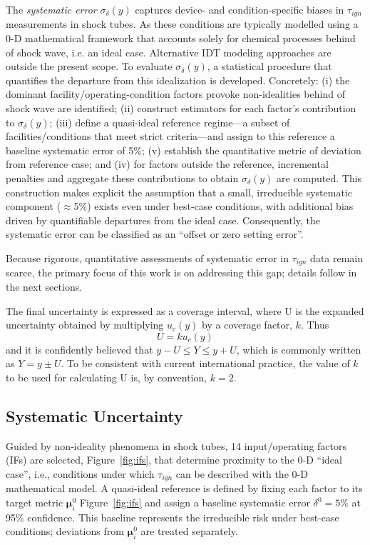 The \textit{systematic error} $\sigma_{\delta}(y)$ captures device- and condition-specific biases in $\tau_{ign}$ measurements in shock tubes. As these conditions are typically modelled using a 0-D mathematical framework that accounts solely for chemical processes behind of shock wave, i.e. an ideal case. Alternative IDT modeling approaches are outside the present scope. To evaluate $\sigma_{\delta}(y)$, a statistical procedure that quantifies the departure from this idealization is developed. Concretely: (i) the dominant facility/operating-condition factors provoke non-idealities behind of shock wave are identified; (ii) construct estimators for each factor's contribution to $\sigma_{\delta}(y)$; (iii) define a quasi-ideal reference regime—a subset of facilities/conditions that meet strict criteria—and assign to this reference a baseline systematic error of 5\%; (v) establish the quantitative metric of deviation from reference case; and (iv) for factors outside the reference, incremental penalties and aggregate these contributions to obtain $\sigma_{\delta}(y)$ are computed. This construction makes explicit the assumption that a small, irreducible systematic component ($\approx$5\%) exists even under best-case conditions, with additional bias driven by quantifiable departures from the ideal case. Consequently, the systematic error can be classified as an ``offset or zero setting error''.

Because rigorous, quantitative assessments of systematic error in $\tau_{ign}$ data remain scarce, the primary focus of this work is on addressing this gap; details follow in the next sections.

The final uncertainty is expressed as a coverage interval, where U is the expanded uncertainty obtained by multiplying $u_c(y)$ by a coverage factor, $k$. Thus
\begin{equation}
	U = k u_c(y)
\end{equation}
and it is confidently believed that $y - U \le Y \le y + U$, which is commonly written as $Y = y \pm U$. To be consistent with current international practice, the value of $k$ to be used for calculating U is, by convention, $k = 2$.





\subsection{Systematic Uncertainty}


Guided by non-ideality phenomena in shock tubes, 14 input/operating factors (IFs) are selected, Figure~\ref{fig:ifs}, that determine proximity to the 0-D ``ideal case'', i.e., conditions under which $\tau_{ign}$ can be described with the 0-D mathematical model. A quasi-ideal reference is defined by fixing each factor to its target metric $\boldsymbol{\mu}_i^0$ Figure~\ref{fig:ifs} and assign a baseline systematic error $\delta^0 = 5\%$ at 95\% confidence. This baseline represents the irreducible risk under best-case conditions; deviations from $\boldsymbol{\mu}_i^0$ are treated separately.


